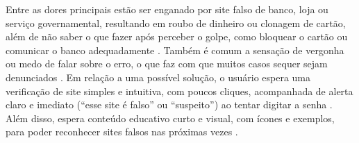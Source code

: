 \documentclass[
  12pt,
  a4paper,
  oneside,
  brazil
]{abntex2}
\begin{document}
Entre as dores principais estão ser enganado por site falso de banco, loja ou serviço
governamental, resultando em roubo de dinheiro ou clonagem de cartão, além de não saber o que
fazer após perceber o golpe, como bloquear o cartão ou comunicar o banco adequadamente
\cite{abecs2023, bcb_rig2024}. Também é comum a sensação de vergonha ou medo de falar sobre o
erro, o que faz com que muitos casos sequer sejam denunciados \cite{abecs2023}. Em relação a
uma possível solução, o usuário espera uma verificação de site simples e intuitiva, com poucos
cliques, acompanhada de alerta claro e imediato (``esse site é falso'' ou ``suspeito'') ao
tentar digitar a senha \cite{certbr2024}. Além disso, espera conteúdo educativo curto e visual,
com ícones e exemplos, para poder reconhecer sites falsos nas próximas vezes
\cite{educafcc2022}.

\postextual

\end{document}

